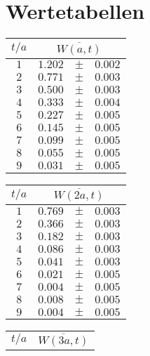\chapter{Wertetabellen}
\label{sec:params}

\begin{table}[htbp]
\begin{tabular}{crcl} 
\hline
    $t/a$ &\multicolumn{3}{c}{$\overline{W(a,t)}$} \\ 
\hline
$1$ &	$1.202$ & 	 $\pm$ & 	 $0.002$\\ 
$2$ &	$0.771$ & 	 $\pm$ & 	 $0.003$\\ 
$3$ &	$0.500$ & 	 $\pm$ & 	 $0.003$\\ 
$4$ &	$0.333$ & 	 $\pm$ & 	 $0.004$\\ 
$5$ &	$0.227$ & 	 $\pm$ & 	 $0.005$\\ 
$6$ &	$0.145$ & 	 $\pm$ & 	 $0.005$\\ 
$7$ &	$0.099$ & 	 $\pm$ & 	 $0.005$\\ 
$8$ &	$0.055$ & 	 $\pm$ & 	 $0.005$\\ 
$9$ &	$0.031$ & 	 $\pm$ & 	 $0.005$\\ 
\hline
\end{tabular}
    \hspace{1cm}
\begin{tabular}{crcl} 
\hline
    $t/a$ &\multicolumn{3}{c}{$\overline{W(2a,t)}$} \\ 
\hline
$1$ &	$0.769$ & 	 $\pm$ & 	 $0.003$\\ 
$2$ &	$0.366$ & 	 $\pm$ & 	 $0.003$\\ 
$3$ &	$0.182$ & 	 $\pm$ & 	 $0.003$\\ 
$4$ &	$0.086$ & 	 $\pm$ & 	 $0.003$\\ 
$5$ &	$0.041$ & 	 $\pm$ & 	 $0.003$\\ 
$6$ &	$0.021$ & 	 $\pm$ & 	 $0.005$\\ 
$7$ &	$0.004$ & 	 $\pm$ & 	 $0.005$\\ 
$8$ &	$0.008$ & 	 $\pm$ & 	 $0.005$\\ 
$9$ &	$0.004$ & 	 $\pm$ & 	 $0.005$\\ 
\hline
\end{tabular}
    \hspace{1cm}
\begin{tabular}{crcl} 
\hline
    $t/a$ &\multicolumn{3}{c}{$\overline{W(3a,t)}$} \\ 

\end{tabular}
\end{table}
